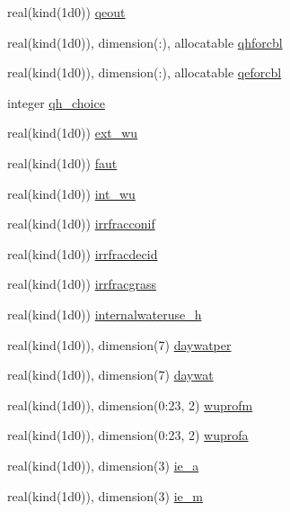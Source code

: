 \begin{DoxyCompactItemize}
real(kind(1d0)) \hyperlink{namespacesues__data_ae467db694bf0c56a1afbee403a0d8907}{qeout}
\item 
real(kind(1d0)), dimension(\+:), allocatable \hyperlink{namespacesues__data_a891cda3d0ef1f628e7dd9a185f00fc6c}{qhforcbl}
\item 
real(kind(1d0)), dimension(\+:), allocatable \hyperlink{namespacesues__data_a08451f44609cb386788368a9136432c7}{qeforcbl}
\item 
integer \hyperlink{namespacesues__data_a2333d97226ad99ef4b17125ad7c3b205}{qh\+\_\+choice}
\item 
real(kind(1d0)) \hyperlink{namespacesues__data_ad2e4c4ffe627921b28183c9f4d8789fd}{ext\+\_\+wu}
\item 
real(kind(1d0)) \hyperlink{namespacesues__data_abc299ffec1296474197ca5a9afb4b254}{faut}
\item 
real(kind(1d0)) \hyperlink{namespacesues__data_affbedb6f34d747605bf529fd2d80d4c7}{int\+\_\+wu}
\item 
real(kind(1d0)) \hyperlink{namespacesues__data_aec92653b01eece5fbbb4f1cdfa3575cf}{irrfracconif}
\item 
real(kind(1d0)) \hyperlink{namespacesues__data_aa6d49b1ef69f02f3bd0334c0d50d9a30}{irrfracdecid}
\item 
real(kind(1d0)) \hyperlink{namespacesues__data_ac09560182eb4e8e83479a33c9ea2f52b}{irrfracgrass}
\item 
real(kind(1d0)) \hyperlink{namespacesues__data_aaec40541d3458d50a5e554aa1ca0848b}{internalwateruse\+\_\+h}
\item 
real(kind(1d0)), dimension(7) \hyperlink{namespacesues__data_aaf929b9a25878b781ca0c2069b3e9468}{daywatper}
\item 
real(kind(1d0)), dimension(7) \hyperlink{namespacesues__data_a55dbeb9abd22aa41d295c4348a2fb6de}{daywat}
\item 
real(kind(1d0)), dimension(0\+:23, 2) \hyperlink{namespacesues__data_a5926d0d936d383d4f839d9e7bcc65f48}{wuprofm}
\item 
real(kind(1d0)), dimension(0\+:23, 2) \hyperlink{namespacesues__data_a8b58e7f44021d419ca3e9da1c2a8db49}{wuprofa}
\item 
real(kind(1d0)), dimension(3) \hyperlink{namespacesues__data_a1ddda58bf0af48716e6e89efefa42b47}{ie\+\_\+a}
\item 
real(kind(1d0)), dimension(3) \hyperlink{namespacesues__data_acc07bf45b728dde4f2c1e0063f79808e}{ie\+\_\+m}
\end{DoxyCompactItemize}


